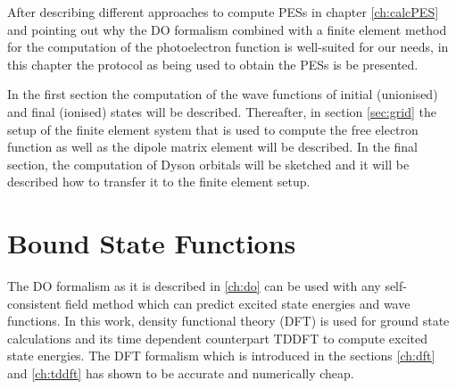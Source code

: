 \label{ch:proced}
After describing different approaches to compute PESs in chapter \ref{ch:calcPES} and pointing out why the DO formalism combined with a finite element method for the computation of the photoelectron function is well-suited for our needs, in this chapter the protocol as being used to obtain the PESs is be presented.

In the first section the computation of the wave functions of initial (unionised) and final (ionised) states will be described.
Thereafter, in section \ref{sec:grid} the setup of the finite element system that is used to compute the free electron function as well as the dipole matrix element will be described.
In the final section, the computation of Dyson orbitals will be sketched and it will be described how to transfer it to the finite element setup.

\section{Bound State Functions}
The DO formalism as it is described in \ref{ch:do} can be used with any self-consistent field method which can predict excited state energies and wave functions.
In this work,  density functional theory (DFT) is used for ground state calculations and its time dependent counterpart TDDFT to compute excited state energies.
The DFT formalism which is introduced in the sections \ref{ch:dft} and \ref{ch:tddft} has shown to be accurate and numerically cheap.

